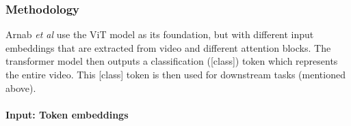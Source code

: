 \subsubsection{Methodology}

\par Arnab \textit{et al} use the ViT model \cite{vit} as its foundation, but with different input embeddings that are extracted from video and different attention blocks. 
The transformer model then outputs a classification ([class]) token which represents the entire video. 
This [class] token is then used for downstream tasks (mentioned above).\par

\paragraph{Input: Token embeddings}

